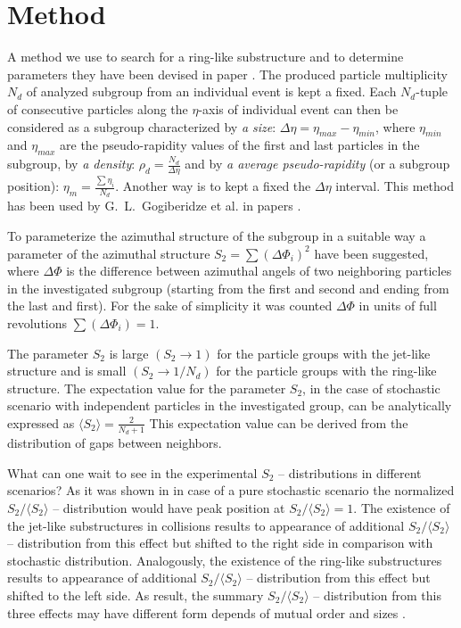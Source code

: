 \documentclass[12pt]{article}
\newcommand{\SDVA}{\langle S_2 \rangle}
\begin{document}

\section{Method}

A method we use to search for a ring-like substructure and to determine parameters they have been devised in paper \cite{bib03}. The produced particle multiplicity $N_d$ of analyzed subgroup from an individual event is kept a fixed. Each $N_d$-tuple of consecutive particles along the $\eta$-axis of individual event can then be considered as a subgroup characterized by 
\textit{a size}: $\Delta\eta = \eta_{max} - \eta_{min}$, where $\eta_{min}$ and $\eta_{max}$ are the pseudo-rapidity values of the first and last particles in the subgroup, 
by \textit{a density}: $\rho_d = \frac{N_d}{\Delta\eta}$ and 
by \textit{a average pseudo-rapidity} (or a subgroup position): $\eta_m = \frac{\sum\eta_i}{N_d}$.
Another way is to kept a fixed the $\Delta\eta$ interval. This method has been used by G.~L.~Gogiberidze et al. in papers \cite{bib19,bib20}.

To parameterize the azimuthal structure of the subgroup in a suitable way a parameter of the
azimuthal structure $S_2 = \sum(\Delta\Phi_i)^2$ 
have been suggested, where $\Delta\Phi$ is the difference between azimuthal angels of two neighboring particles in the investigated subgroup (starting from the first and second and ending from the last and first). For the sake of simplicity it was counted $\Delta\Phi$ in units of full revolutions $\sum(\Delta\Phi_i) = 1$. 

The parameter $S_2$ is large $(S_2 \rightarrow 1)$ for the particle groups with the jet-like structure and is small $(S_2 \rightarrow 1/N_d)$ for the particle groups with the ring-like structure. The expectation value for the parameter $S_2$, in the case of stochastic scenario with independent particles in the investigated group, can be analytically expressed as $\SDVA = \frac{2}{N_d + 1}$ 
This expectation value can be derived from the distribution of gaps between neighbors.

What can one wait to see in the experimental $S_2$ -- distributions in different scenarios? As it was shown in \cite{bib18} in case of a pure stochastic scenario the normalized $S_2/\SDVA$ -- distribution would have peak position at $S_2/\SDVA = 1$. The existence of the jet-like substructures in collisions results to appearance of additional  $S_2/\SDVA$ -- distribution from this effect but shifted to the right side in comparison with stochastic distribution. Analogously, the existence of the ring-like substructures results to appearance of additional $S_2/\SDVA$ -- distribution from this effect but shifted to the left side. As result, the summary $S_2/\SDVA$ -- distribution from this three effects may have different form depends of mutual order and sizes \cite{bib18}.
\end{document}

